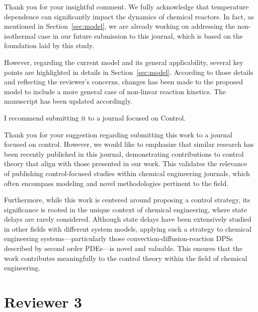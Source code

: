 \documentclass[12pt,answers]{exam}
\begin{document}
\begin{questions}
    \begin{solutionorbox}
        Thank you for your insightful comment. We fully acknowledge that temperature dependence can significantly impact the dynamics of chemical reactors. In fact, as mentioned in Section~\ref{sec:model}, we are already working on addressing the non-isothermal case in our future submission to this journal, which is based on the foundation laid by this study. 
        
        However, regarding the current model and its general applicability, several key points are highlighted in details in Section~\ref{sec:model}. According to those details and reflecting the reviewer's concerns, changes has been made to the proposed model to include a more general case of non-linear reaction kinetics. The manuscript has been updated accordingly.
    \end{solutionorbox}


    \question I recommend submitting it to a journal focused on Control.

    \begin{solutionorbox}
        Thank you for your suggestion regarding submitting this work to a journal focused on control. However, we would like to emphasize that similar research \cite{li2024novel, azhin2021modelling} has been recently published in this journal, demonstrating contributions to control theory that align with those presented in our work. This validates the relevance of publishing control-focused studies within chemical engineering journals, which often encompass modeling and novel methodologies pertinent to the field.

        Furthermore, while this work is centered around proposing a control strategy, its significance is rooted in the unique context of chemical engineering, where state delays are rarely considered. Although state delays have been extensively studied in other fields with different system models, applying such a strategy to chemical engineering systems—particularly those convection-diffusion-reaction DPSs described by second order PDEs—is novel and valuable. This ensures that the work contributes meaningfully to the control theory within the field of chemical engineering.
    \end{solutionorbox}

\end{questions}

\newpage
\section*{Reviewer 3}
\end{document}

